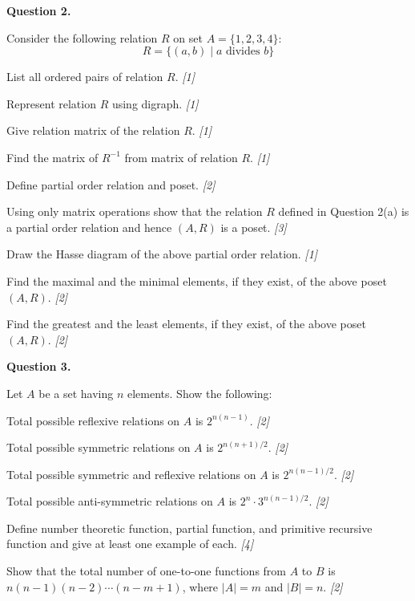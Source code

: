 \documentclass[11pt,a4paper]{article}
\newcommand{\pts}[1]{\hfill\textit{[#1]}}
\begin{document}
\medskip\noindent\textbf{Question 2.}
\begin{parts}
  \item Consider the following relation $R$ on set $A = \{1, 2, 3, 4\}$:
  \[ R = \{(a, b) \mid a \text{ divides } b\} \]
  \begin{parts}
    \item List all ordered pairs of relation $R$. \pts{1}
    \item Represent relation $R$ using digraph. \pts{1}
    \item Give relation matrix of the relation $R$. \pts{1}
    \item Find the matrix of $R^{-1}$ from matrix of relation $R$. \pts{1}
  \end{parts}
  \item 
  \begin{parts}
    \item Define partial order relation and poset. \pts{2}
    \item Using only matrix operations show that the relation $R$ defined in Question 2(a) is a partial order relation and hence $(A, R)$ is a poset. \pts{3}
    \item Draw the Hasse diagram of the above partial order relation. \pts{1}
    \item Find the maximal and the minimal elements, if they exist, of the above poset $(A, R)$. \pts{2}
    \item Find the greatest and the least elements, if they exist, of the above poset $(A, R)$. \pts{2}
  \end{parts}
\end{parts}

\medskip\noindent\textbf{Question 3.}
\begin{parts}
  \item Let $A$ be a set having $n$ elements. Show the following:
  \begin{parts}
    \item Total possible reflexive relations on $A$ is $2^{n(n-1)}$. \pts{2}
    \item Total possible symmetric relations on $A$ is $2^{n(n+1)/2}$. \pts{2}
    \item Total possible symmetric and reflexive relations on $A$ is $2^{n(n-1)/2}$. \pts{2}
    \item Total possible anti-symmetric relations on $A$ is $2^n \cdot 3^{n(n-1)/2}$. \pts{2}
  \end{parts}
  \item Define number theoretic function, partial function, and primitive recursive function and give at least one example of each. \pts{4}
  \item Show that the total number of one-to-one functions from $A$ to $B$ is $n(n-1)(n-2)\cdots(n-m+1)$, where $|A| = m$ and $|B| = n$. \pts{2}
\end{parts}
\end{document}
